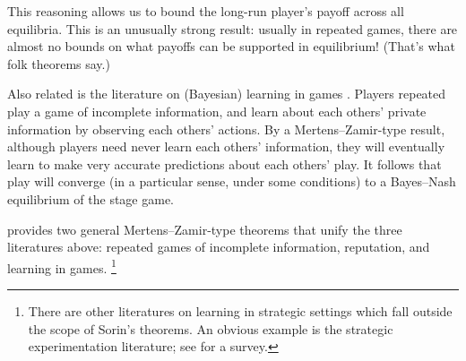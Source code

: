 \documentclass[11pt,letterpaper,reqno,oneside]{article}
\begin{document}
This reasoning allows us to bound the long-run player's payoff across all equilibria. This is an unusually strong result: usually in repeated games, there are almost no bounds on what payoffs can be supported in equilibrium! (That's what folk theorems say.)


Also related is the literature on (Bayesian) learning in games \textcite{KalaiLehrer1993}. Players repeated play a game of incomplete information, and learn about each others' private information by observing each others' actions. By a Mertens--Zamir-type result, although players need never learn each others' information, they will eventually learn to make very accurate predictions about each others' play. It follows that play will converge (in a particular sense, under some conditions) to a Bayes--Nash equilibrium of the stage game.


\textcite{Sorin1999} provides two general Mertens--Zamir-type theorems that unify the three literatures above: repeated games of incomplete information, reputation, and learning in games.%
	\footnote{There are other literatures on learning in strategic settings which fall outside the scope of Sorin's theorems. An obvious example is the strategic experimentation literature; see \textcite{HornerSkrzypacz2017} for a survey.}





















\pagebreak
\printbibliography[heading=bibintoc]



\end{document}
